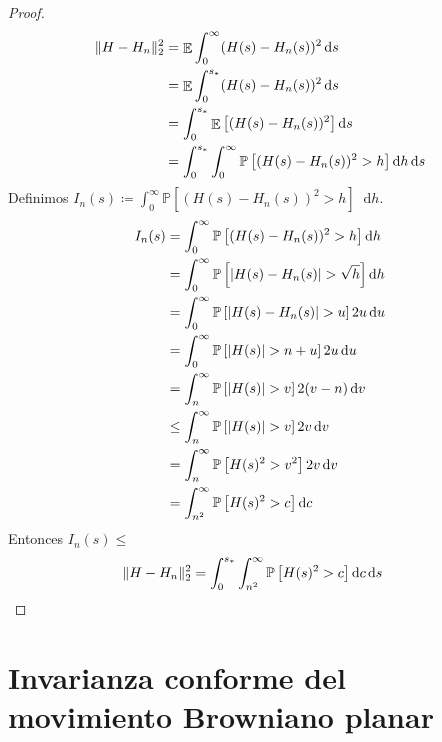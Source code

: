 \documentclass{report}
\newcommand{\prob}{\mathbb{P}}
\newcommand{\dd}{\mathop{}\!\mathrm{d}}
\DeclareMathOperator{\Expectation}{\mathbb{E}}
\DeclarePairedDelimiter{\abs}{\lvert}{\rvert}
\DeclarePairedDelimiter{\norm}{\|}{\|}
\theoremstyle{plain}
\theoremstyle{remark}
\theoremstyle{definition}
\begin{document}
\begin{proof}
  \begin{align}
    \norm{H - H_n}_2^2
    &=
    \Expectation \int_0^{\infty} (H(s) - H_n(s))^2 \dd s
    \\
    &=
    \Expectation \int_0^{s_*} (H(s) - H_n(s))^2 \dd s
    \\
    &=
    \int_0^{s_*} \Expectation \left[ (H(s) - H_n(s))^2 \right] \dd s
    \\
    &=
    \int_0^{s_*} \int_0^{\infty} \prob \left[ (H(s) - H_n(s))^2 > h \right] \dd h \dd s
  \end{align}
  Definimos \(I_n(s) \coloneqq \int_0^{\infty} \prob \left[ (H(s) - H_n(s))^2 > h \right] \dd h\).
  \begin{align}
    I_n(s)
    &=
    \int_0^{\infty} \prob \left[ (H(s) - H_n(s))^2 > h \right] \dd h
    \\
    &=
    \int_0^{\infty} \prob \left[ \abs{H(s) - H_n(s)} > \sqrt{h} \right] \dd h
    \\
    &=
    \int_0^{\infty} \prob \left[ \abs{H(s) - H_n(s)} > u \right] 2 u \dd u
    \\
    &=
    \int_0^{\infty} \prob \left[ \abs{H(s)} > n + u \right] 2 u \dd u
    \\
    &=
    \int_n^{\infty} \prob \left[ \abs{H(s)} > v \right] 2 (v - n) \dd v
    \\
    &\leq
    \int_n^{\infty} \prob \left[ \abs{H(s)} > v \right] 2 v \dd v
    \\
    &=
    \int_n^{\infty} \prob \left[ H(s)^2 > v^2 \right] 2 v \dd v
    \\
    &=
    \int_{n^2}^{\infty} \prob \left[ H(s)^2 > c \right] \dd c
  \end{align}
  Entonces \(I_n(s) \leq \)
  \begin{align}
    \norm{H - H_n}_2^2
    &=
    \int_0^{s_*} 
      \int_{n^2}^{\infty} 
        \prob \left[ H(s)^2 > c \right] 
      \dd c 
    \dd s
  \end{align}
  
\end{proof}


\part{Invarianza conforme del movimiento Browniano planar}
\end{document}
